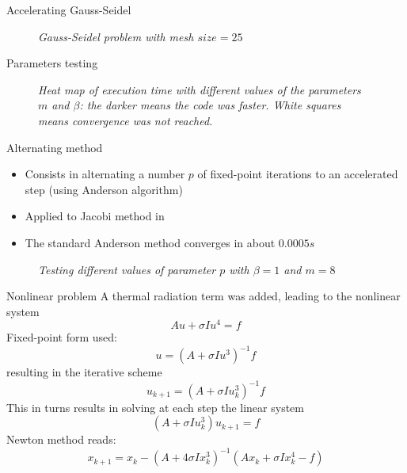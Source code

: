 \documentclass{beamer}
\begin{document}
				\begin{frame}{Accelerating Gauss-Seidel}
			\begin{figure}
			{\scriptsize
			}
			\centering
			\caption{\textit{Gauss-Seidel problem with mesh $size=25$}}
			\end{figure}
			\end{frame}
			
			\begin{frame}[fragile]{Parameters testing}
			\begin{figure}
			{\scriptsize
			\resizebox{\textwidth}{!}{}
			\centering
			\caption{\textit{Heat map of execution time with different values of the parameters $m$ and $\beta$: the darker means the code was faster. White squares means
			convergence was not reached.}}}
			\end{figure}
			\end{frame}
				
			\begin{frame}[fragile]{Alternating method}
				\begin{itemize}
					\item Consists in alternating a number $p$ of fixed-point iterations to an accelerated step (using Anderson algorithm)
					\item Applied to Jacobi method in \cite{Pratapa}
					\item The standard Anderson method converges in
			about $0.0005 s$
				\end{itemize}

			\begin{figure}
			{\scriptsize
			\resizebox{!}{3.5cm}{
			}}
			\caption{\textit{Testing different values of parameter $p$ with $\beta=1$ and $m=8$}}
			\centering
			\end{figure}

			\end{frame}
				
				\begin{frame}{Nonlinear problem}
						A thermal radiation term was added, leading to the nonlinear system
			\begin{equation*}
				A u + \sigma I u^4 = f
			\end{equation*}
			Fixed-point form used:
			\begin{equation*}
				u = (A+ \sigma I u^3)^{-1} f 
			\end{equation*}
			resulting in the iterative scheme
			\begin{equation*}
				u_{k+1}= (A+ \sigma I u^3_k)^{-1} f 
			\end{equation*}
			This in turns results in solving at each step the linear system
			\begin{equation*}
				(A+ \sigma I u^3_k) u_{k+1} = f
			\end{equation*}
			Newton method reads:
			\begin{equation*}
				x_{k+1}= x_k - (A+4 \sigma I x_k^3)^{-1}(A x_k + \sigma I x_k^4 - f)
			\end{equation*}
		
				\end{frame}
				
\end{document}
